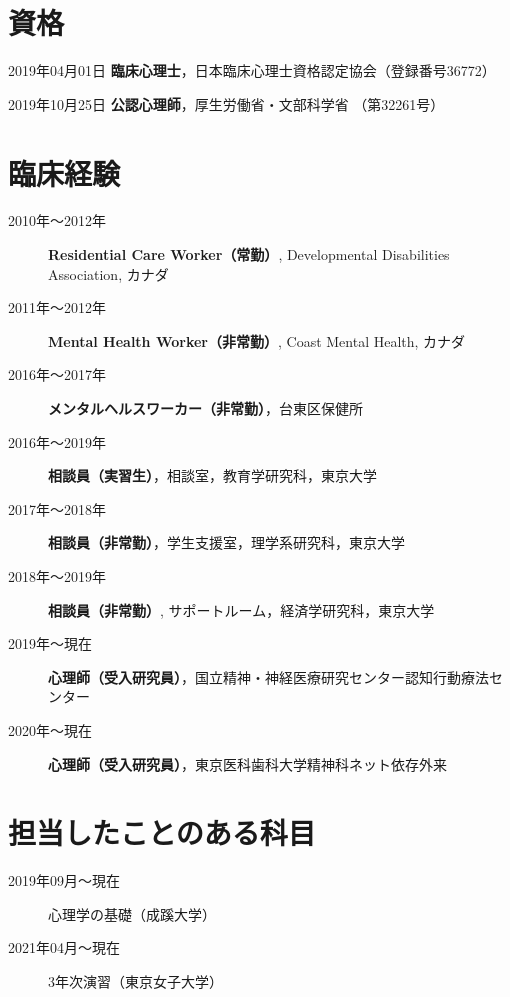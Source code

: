 \documentclass{article}
\begin{document}
\section{資格}
\begin{description}
	\item 2019年04月01日 \textbf{臨床心理士}，日本臨床心理士資格認定協会（登録番号36772）
	\item 2019年10月25日 \textbf{公認心理師}，厚生労働省・文部科学省 （第32261号）
\end{description}

\section{臨床経験}
	\begin{description}
	\item [2010年〜2012年] \textbf{Residential Care Worker（常勤）}, Developmental Disabilities Association, カナダ
	\item [2011年〜2012年] \textbf{Mental Health Worker（非常勤）}, Coast Mental Health, カナダ
	\item [2016年〜2017年] \textbf{メンタルヘルスワーカー（非常勤）}，台東区保健所
	\item [2016年〜2019年] \textbf{相談員（実習生）}，相談室，教育学研究科，東京大学
	\item [2017年〜2018年] \textbf{相談員（非常勤）}，学生支援室，理学系研究科，東京大学
	\item [2018年〜2019年] \textbf{相談員（非常勤）}, サポートルーム，経済学研究科，東京大学
	\item [2019年〜現在] \textbf{心理師（受入研究員）}，国立精神・神経医療研究センター認知行動療法センター
	\item [2020年〜現在] \textbf{心理師（受入研究員）}，東京医科歯科大学精神科ネット依存外来
	\end{description}

\section{担当したことのある科目}
\begin{description}
	\item [2019年09月～現在]	心理学の基礎（成蹊大学）
	\item [2021年04月〜現在] 3年次演習（東京女子大学）
\end{description}
\end{document}
